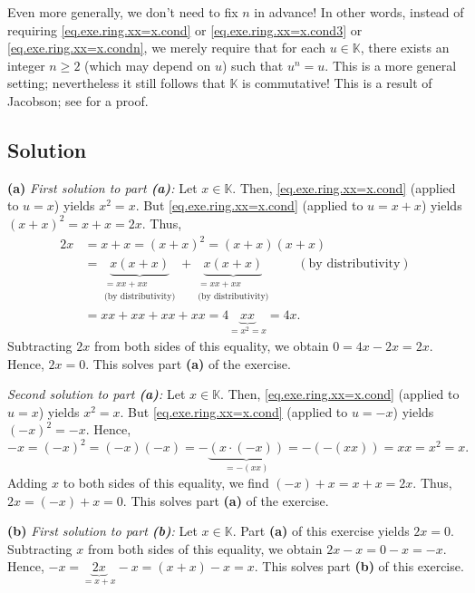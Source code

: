 \documentclass[paper=a4, fontsize=12pt]{scrartcl}%
\theoremstyle{plainsl}
\theoremstyle{definition}
\theoremstyle{remark}
\begin{document}
Even more generally, we don't need to fix $n$ in advance! In other words,
instead of requiring \eqref{eq.exe.ring.xx=x.cond} or
\eqref{eq.exe.ring.xx=x.cond3} or \eqref{eq.exe.ring.xx=x.condn}, we merely
require that for each $u\in\mathbb{K}$, there exists an integer $n\geq2$
(which may depend on $u$) such that $u^{n}=u$. This is a more general setting;
nevertheless it still follows that $\mathbb{K}$ is commutative! This is a
result of Jacobson; see \cite{Rogers71} for a proof.

\subsection{Solution}

\textbf{(a)} \textit{First solution to part \textbf{(a)}:} Let $x\in
\mathbb{K}$. Then, \eqref{eq.exe.ring.xx=x.cond} (applied to $u=x$) yields
$x^{2}=x$. But \eqref{eq.exe.ring.xx=x.cond} (applied to $u=x+x$) yields
$\left(  x+x\right)  ^{2}=x+x=2x$. Thus,%
\begin{align*}
2x  &  =x+x=\left(  x+x\right)  ^{2}=\left(  x+x\right)  \left(  x+x\right) \\
&  =\underbrace{x\left(  x+x\right)  }_{\substack{=xx+xx\\\text{(by
distributivity)}}}+\underbrace{x\left(  x+x\right)  }%
_{\substack{=xx+xx\\\text{(by distributivity)}}}\qquad\left(  \text{by
distributivity}\right) \\
&  =xx+xx+xx+xx=4\underbrace{xx}_{=x^{2}=x}=4x.
\end{align*}
Subtracting $2x$ from both sides of this equality, we obtain $0=4x-2x=2x$.
Hence, $2x=0$. This solves part \textbf{(a)} of the exercise.

\textit{Second solution to part \textbf{(a)}:} Let $x\in\mathbb{K}$. Then,
\eqref{eq.exe.ring.xx=x.cond} (applied to $u=x$) yields $x^{2}=x$. But
\eqref{eq.exe.ring.xx=x.cond} (applied to $u=-x$) yields $\left(  -x\right)
^{2}=-x$. Hence,%
\[
-x=\left(  -x\right)  ^{2}=\left(  -x\right)  \left(  -x\right)
=-\underbrace{\left(  x\cdot\left(  -x\right)  \right)  }_{=-\left(
xx\right)  }=-\left(  -\left(  xx\right)  \right)  =xx=x^{2}=x.
\]
Adding $x$ to both sides of this equality, we find $\left(  -x\right)
+x=x+x=2x$. Thus, $2x=\left(  -x\right)  +x=0$. This solves part \textbf{(a)}
of the exercise.

\bigskip

\textbf{(b)} \textit{First solution to part \textbf{(b)}:} Let $x\in
\mathbb{K}$. Part \textbf{(a)} of this exercise yields $2x=0$. Subtracting $x$
from both sides of this equality, we obtain $2x-x=0-x=-x$. Hence,
$-x=\underbrace{2x}_{=x+x}-x=\left(  x+x\right)  -x=x$. This solves part
\textbf{(b)} of this exercise.
\end{document}
